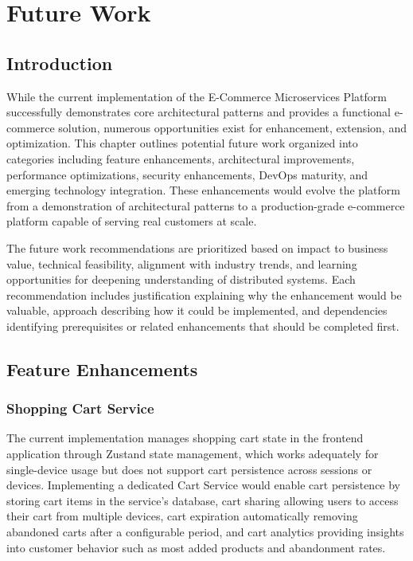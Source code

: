 \chapter{Future Work}

\section{Introduction}

While the current implementation of the E-Commerce Microservices Platform successfully demonstrates core architectural patterns and provides a functional e-commerce solution, numerous opportunities exist for enhancement, extension, and optimization. This chapter outlines potential future work organized into categories including feature enhancements, architectural improvements, performance optimizations, security enhancements, DevOps maturity, and emerging technology integration. These enhancements would evolve the platform from a demonstration of architectural patterns to a production-grade e-commerce platform capable of serving real customers at scale.

The future work recommendations are prioritized based on impact to business value, technical feasibility, alignment with industry trends, and learning opportunities for deepening understanding of distributed systems. Each recommendation includes justification explaining why the enhancement would be valuable, approach describing how it could be implemented, and dependencies identifying prerequisites or related enhancements that should be completed first.

\section{Feature Enhancements}

\subsection{Shopping Cart Service}

The current implementation manages shopping cart state in the frontend application through Zustand state management, which works adequately for single-device usage but does not support cart persistence across sessions or devices. Implementing a dedicated Cart Service would enable cart persistence by storing cart items in the service's database, cart sharing allowing users to access their cart from multiple devices, cart expiration automatically removing abandoned carts after a configurable period, and cart analytics providing insights into customer behavior such as most added products and abandonment rates.

